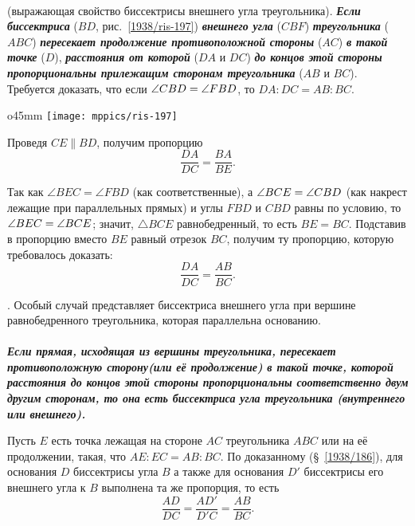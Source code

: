 {\small

\paragraph{}\label{1938/187}
 (выражающая свойство биссектрисы внешнего угла треугольника).
\textbf{\emph{Если биссектриса}} ($BD$, рис.~\ref{1938/ris-197}) \textbf{\emph{внешнего угла}} ($CBF$) \textbf{\emph{треугольника}} ($ABC$) \textbf{\emph{пересекает продолжение противоположной стороны}} ($AC$) \textbf{\emph{в такой точке}} ($D$), \textbf{\emph{расстояния от которой}} ($DA$ и $DC$) \textbf{\emph{до концов этой стороны пропорциональны прилежащим сторонам треугольника}} ($AB$ и $BC$).
Требуется доказать, что если $\angle CBD\z=\angle FBD$, то $DA:DC=AB:BC$.

\begin{wrapfigure}[9]{o}{45mm}
\vskip-4mm
\centering
\texttt{[image: mppics/ris-197]}
\caption{}\label{1938/ris-197}
\end{wrapfigure}

Проведя $CE \parallel BD$, получим пропорцию
\[\frac{DA}{DC}=\frac{BA}{BE}.\]

Так как $\angle BEC=\angle FBD$ (как соответственные), а $\angle BCE\z=\angle CBD$ (как накрест лежащие при параллельных прямых) и углы $FBD$ и $CBD$ равны по условию, то $\angle BEC\z=\angle BCE$;
значит, $\triangle BCE$ равнобедренный, то есть $BE=BC$.
Подставив в пропорцию вместо $BE$ равный отрезок $BC$, получим ту пропорцию, которую требовалось доказать:
\[\frac{DA}{DC}=\frac{AB}{BC}.\]

{\small 

\smallskip
{}.
Особый случай представляет биссектриса внешнего угла при вершине равнобедренного треугольника, которая параллельна основанию.

}

{\sloppy

\paragraph{}\label{1914/227}
\textbf{\emph{Если прямая, исходящая из вершины треугольника, пересекает противоположную сторону(или её продолжение) в такой точке, которой расстояния до концов этой стороны пропорциональны соответственно двум другим сторонам, то она есть биссектриса угла треугольника (внутреннего или внешнего).}}

}

Пусть  $E$ есть точка лежащая на стороне $AC$ треугольника $ABC$ или на её продолжении, такая, что
$AE:EC=AB:BC$.
По доказанному (§~\ref{1938/186}), для основания $D$ биссектрисы угла $B$ а также для основания $D'$ биссектрисы его внешнего угла к $B$ выполнена та же пропорция, то есть
\[\frac{AD}{DC}=\frac{AD'}{D'C}=\frac{AB}{BC}.\]

}

